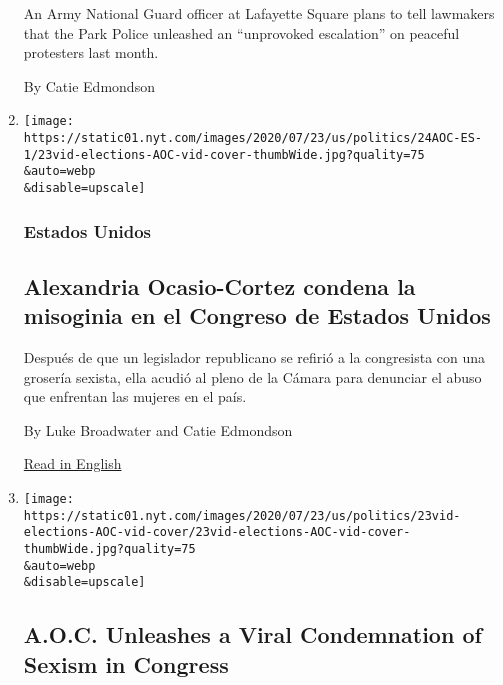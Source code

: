 \begin{enumerate}
  An Army National Guard officer at Lafayette Square plans to tell
  lawmakers that the Park Police unleashed an ``unprovoked escalation''
  on peaceful protesters last month.

  By Catie Edmondson
\item
  \href{/es/2020/07/24/espanol/estados-unidos/alexandria-ocasio-cortez-insulto.html}{}

  \texttt{[image: https://static01.nyt.com/images/2020/07/23/us/politics/24AOC-ES-1/23vid-elections-AOC-vid-cover-thumbWide.jpg?quality=75\\\&auto=webp\\\&disable=upscale]}

  \hypertarget{estados-unidos}{%
  \subsubsection{Estados Unidos}\label{estados-unidos}}

  \hypertarget{alexandria-ocasio-cortez-condena-la-misoginia-en-el-congreso-de-estados-unidos}{%
  \subsection{Alexandria Ocasio-Cortez condena la misoginia en el
  Congreso de Estados
  Unidos}\label{alexandria-ocasio-cortez-condena-la-misoginia-en-el-congreso-de-estados-unidos}}

  Después de que un legislador republicano se refirió a la congresista
  con una grosería sexista, ella acudió al pleno de la Cámara para
  denunciar el abuso que enfrentan las mujeres en el país.

  By Luke Broadwater and Catie Edmondson

  \href{https://www.nytimes.com/2020/07/23/us/alexandria-ocasio-cortez-sexism-congress.html}{Read
  in English}
\item
  \href{/2020/07/23/us/alexandria-ocasio-cortez-sexism-congress.html}{}

  \texttt{[image: https://static01.nyt.com/images/2020/07/23/us/politics/23vid-elections-AOC-vid-cover/23vid-elections-AOC-vid-cover-thumbWide.jpg?quality=75\\\&auto=webp\\\&disable=upscale]}

  \hypertarget{aoc-unleashes-a-viral-condemnation-of-sexism-in-congress}{%
  \subsection{A.O.C. Unleashes a Viral Condemnation of Sexism in
  Congress}\label{aoc-unleashes-a-viral-condemnation-of-sexism-in-congress}}


\end{enumerate}
